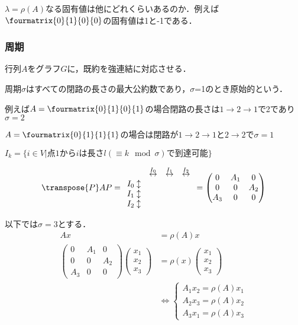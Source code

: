 $\lambda =\rho (A)$なる固有値は他にどれくらいあるのか．例えば$\fourmatrix{0}{1}{0}{0}$の固有値は1と-1である．
\subsubsection{周期}
行列$A$をグラフ$G$に，既約を強連結に対応させる．

\begin{dfn}
  周期$\sigma$はすべての閉路の長さの最大公約数であり，$\sigma$=1のとき原始的という．
\end{dfn}
例えば$A=\fourmatrix{0}{1}{0}{1}$の場合閉路の長さは$1\to 2\to 1$で2であり$\sigma =2$

$A=\fourmatrix{0}{1}{1}{1}$の場合は閉路が$1\to 2\to 1と2\to 2$で$\sigma =1$

$I_k = \{ i\in V| 点1からiは長さl(\equiv k\mod\sigma )で到達可能\}$

\begin{equation}
  \transpose{P}AP=
  \begin{array}{rccc}
    &\overset{I_0}{\leftrightarrow}&\overset{I_1}{\leftrightarrow}&\overset{I_2}{\leftrightarrow}\\
    I_0 \updownarrow&&&\\
    I_1 \updownarrow&&&\\
    I_2 \updownarrow&&&\\
  \end{array}=
  \begin{pmatrix}
    0&A_1 &0\\
    0&0&A_2\\
    A_3 &0&0
  \end{pmatrix}
\end{equation}

以下では$\sigma =3$とする．
\begin{align*}
  Ax&=\rho (A)x\\
  \begin{pmatrix}
    0&A_1 &0\\
    0&0&A_2\\
    A_3 &0&0
  \end{pmatrix}
  \begin{pmatrix}
    x_1\\
    x_2\\
    x_3
  \end{pmatrix}
  &=\rho (x)
  \begin{pmatrix}
    x_1\\
    x_2\\
    x_3
  \end{pmatrix}\\
  &\Leftrightarrow
  \begin{cases}
    A_1 x_2 =\rho (A)x_1\\
    A_2 x_3 =\rho (A)x_2\\
    A_3 x_1 =\rho (A)x_3
  \end{cases}
\end{align*}

